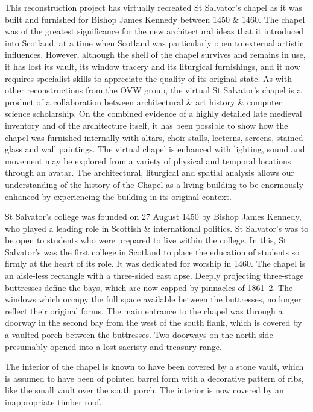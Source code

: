 
This reconstruction project has virtually recreated St Salvator’s chapel as it was built and furnished for Bishop James Kennedy between 1450 \& 1460. The chapel was of the greatest significance for the new architectural ideas that it introduced into Scotland, at a time when Scotland was particularly open to external artistic influences. However, although the shell of the chapel survives and remains in use, it has lost its vault, its window tracery and its liturgical furnishings, and it now requires specialist skills to appreciate the quality of its original state. As with other reconstructions from the OVW group, the virtual St Salvator's chapel is a product of a collaboration between architectural \& art history \& computer science scholarship. On the combined evidence of a highly detailed late medieval inventory and of the architecture itself, it has been possible to show how the chapel was furnished internally with altars, choir stalls, lecterns, screens, stained glass and wall paintings. The virtual chapel is enhanced with lighting, sound and movement may be explored from a variety of physical and temporal locations through an avatar. The architectural, liturgical and spatial analysis allows our understanding of the history of the Chapel as a living building to be enormously enhanced by experiencing the building in its original context.

St Salvator's college was founded on 27 August 1450 by Bishop James Kennedy, who played a leading role in Scottish \& international politics. St Salvator’s was to be open to students who were prepared to live within the college. In this, St Salvator’s was the first college in Scotland to place the education of students so firmly at the heart of its role. It was dedicated for worship in 1460. The chapel is an aisle-less rectangle with a three-sided east apse. Deeply projecting three-stage buttresses define the bays, which are now capped by pinnacles of 1861–2. The windows which occupy the full space available between the buttresses, no longer reflect their original forms. The main entrance to the chapel was through a doorway in the second bay from the west of the south flank, which is covered by a vaulted porch between the buttresses. Two doorways on the north side presumably opened into a lost sacristy and treasury range.

The interior of the chapel is known to have been covered by a stone vault, which is assumed to have been of pointed barrel form with a decorative pattern of ribs, like the small vault over the south porch. The interior is now covered by an inappropriate timber roof.

